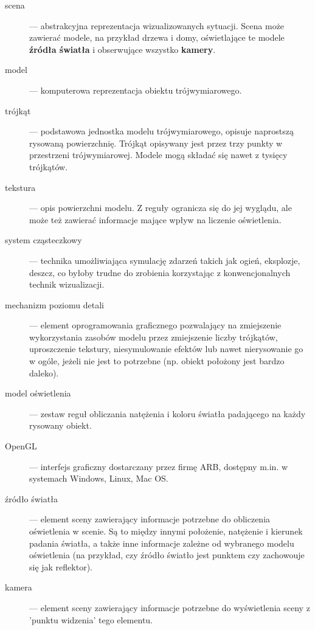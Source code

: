 \documentclass[11pt,leqno]{article}
\begin{document}
\begin{description}
 \item[scena] --- abstrakcyjna reprezentacja wizualizowanych sytuacji. Scena może zawierać modele, na przykład drzewa i domy, oświetlające te modele {\bf źródła światła} i obserwujące wszystko {\bf kamery}.
 
 \item[model] --- komputerowa reprezentacja obiektu trójwymiarowego.


\item[trójkąt] --- podstawowa jednostka modelu trójwymiarowego, opisuje naprostszą rysowaną powierzchnię. Trójkąt opisywany jest przez trzy punkty w przestrzeni trójwymiarowej. Modele mogą składać się nawet z tysięcy trójkątów.

\item[tekstura] --- opis powierzchni modelu. Z reguły ogranicza się do jej wyglądu, ale może też zawierać informacje mające wpływ na liczenie oświetlenia.

\item[system cząsteczkowy] --- technika umożliwiająca symulację zdarzeń takich jak ogień, eksplozje, deszcz, co byłoby trudne do zrobienia korzystając z konwencjonalnych technik wizualizacji.

\item[mechanizm poziomu detali] --- element oprogramowania graficznego pozwalający na zmiejszenie wykorzystania zasobów modelu przez zmiejszenie liczby trójkątów, uproszczenie tekstury, niesymulowanie efektów lub nawet nierysowanie go w ogóle, jeżeli nie jest to potrzebne (np. obiekt położony jest bardzo daleko).

\item[model oświetlenia] --- zestaw reguł obliczania natężenia i koloru światła padającego na każdy rysowany obiekt.

\item[OpenGL] --- interfejs graficzny dostarczany przez firmę ARB, dostępny m.in. w systemach Windows, Linux, Mac OS.

\item[źródło światła] --- element sceny zawierający informacje potrzebne do obliczenia oświetlenia w scenie. Są to między innymi położenie, natężenie i kierunek padania światła, a także inne informacje zależne od wybranego modelu oświetlenia (na przykład, czy źródło światło jest punktem czy zachowouje się jak reflektor).

\item[kamera] --- element sceny zawierający informacje potrzebne do wyświetlenia sceny z 'punktu widzenia' tego elementu.
 \end{description}
\end{document}
